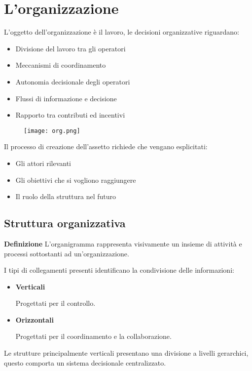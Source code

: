 \documentclass{article}
\newcommand{\df}{\noindent\textbf{Definizione }}
\begin{document}
\section{L'organizzazione}

L'oggetto dell'organizzazione è il lavoro, le decisioni organizzative riguardano:
\begin{itemize}
    \item Divisione del lavoro tra gli operatori
    \item Meccanismi di coordinamento
    \item Autonomia decisionale degli operatori
    \item Flussi di informazione e decisione
    \item Rapporto tra contributi ed incentivi\newline
\end{itemize}

\begin{figure}[ht]
    \centering
    \texttt{[image: org.png]}
    \label{fig:assetto}
\end{figure}

\vspace{5pt}

\noindent Il processo di creazione dell'assetto richiede che vengano esplicitati:
\begin{itemize}
    \item Gli attori rilevanti
    \item Gli obiettivi che si vogliono raggiungere
    \item Il ruolo della struttura nel futuro
\end{itemize}

\newpage

\subsection{Struttura organizzativa}

\df L'organigramma rappresenta visivamente un insieme di attività e processi sottostanti ad un'organizzazione.\newline

\noindent I tipi di collegamenti presenti identificano la condivisione delle informazioni:
\begin{itemize}
    \item \textbf{Verticali}

        Progettati per il controllo.
    
    \item \textbf{Orizzontali}

        Progettati per il coordinamento e la collaborazione.
    
\end{itemize}
\noindent Le strutture principalmente verticali presentano una divisione a livelli gerarchici, questo comporta un sistema decisionale centralizzato.\newline
\end{document}
